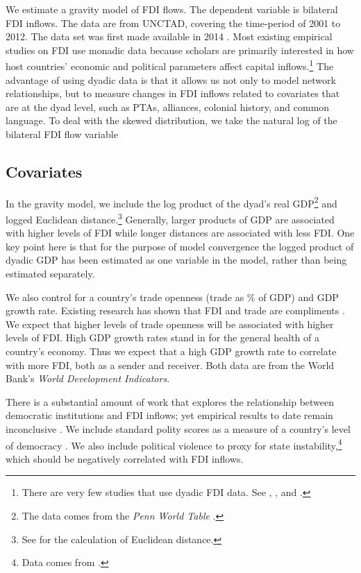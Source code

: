 \documentclass{article}
\begin{document}
We estimate a gravity model of FDI flows. The dependent variable is bilateral FDI inflows. The data are from UNCTAD, covering the time-period of 2001 to 2012. The data set was first made available in 2014 \citep{UNCTAD:2014}. Most existing empirical studies on FDI use monadic data because scholars are primarily interested in how host countries' economic and political parameters affect capital inflows.\footnote{There are very few studies that use dyadic FDI data. See \citet{Frenkel_et_al:2004}, \citet{Li_Vashchilko:2010}, and \citet{Razin_et_al:2005}. } The advantage of using dyadic data is that it allows us not only to model network relationships, but to measure changes in FDI inflows related to covariates that are at the dyad level, such as PTAs, alliances, colonial history, and common language. To deal with the skewed distribution, we take the natural log of the bilateral FDI flow variable

\subsection{Covariates}

In the gravity model, we include the log product of the dyad's real GDP\footnote{The data comes from the \textit{Penn World Table}  \citep{feenstra2015next}.} and logged Euclidean distance.\footnote{See \citet{mayer2011notes} for the calculation of Euclidean distance.} Generally, larger products of GDP are associated with higher levels of FDI while longer distances are associated with less FDI. One key point here is that for the purpose of model convergence the logged product of dyadic GDP has been estimated as one variable in the model, rather than being estimated separately.

We also control for a country's trade openness (trade as \% of GDP) and GDP growth rate. Existing research has shown that FDI and trade are compliments \citep{aizenman2006fdi}. We expect that higher levels of trade openness will be associated with higher levels of FDI. High GDP growth rates stand in for the general health of a country's economy. Thus we expect that a high GDP growth rate to correlate with more FDI, both as a sender and receiver. Both data are from the World Bank's \textit{World Development Indicators}.

There is a substantial amount of work that explores the relationship between democratic institutions and FDI inflows; yet empirical results to date remain inconclusive \citep[see e.g.][]{Henisz:2000,Jensen:2003,Li_Resnick:2003,Jakobsen_DeSoysa:2006,Resnick:2001}. We include standard polity scores as a measure of a country's level of democracy \citep{Marshall_Jaggers:2010}. We also include political violence to proxy for state instability,\footnote{Data comes from \citet{marshall2005major}.} which should be negatively correlated with FDI inflows.
\end{document}
